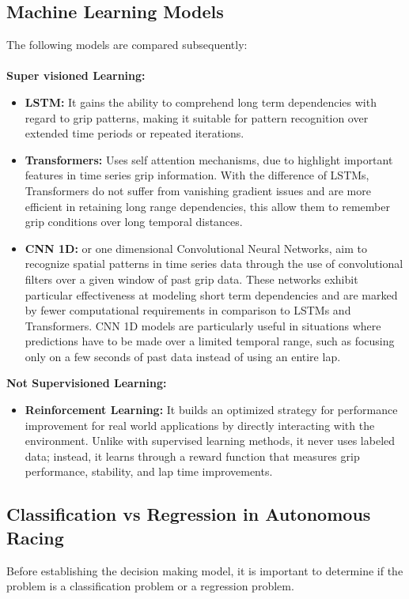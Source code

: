 \documentclass[a4paper,final,12pt]{report}
\begin{document}
\subsection{Machine Learning Models}
The following models are compared subsequently:\\\\
\textbf{Super visioned Learning:}
\begin{itemize}
    \item \textbf{LSTM:} It gains the ability to comprehend long term dependencies with regard to grip patterns, making it suitable for pattern recognition over extended time periods or repeated iterations.
    \item \textbf{Transformers:} Uses self attention mechanisms, due to highlight important features in time series grip information. With the difference of LSTMs, Transformers do not suffer from vanishing gradient issues and are more efficient in retaining long range dependencies, this allow them to remember grip conditions over long temporal distances.
    \item \textbf{CNN 1D:} or one dimensional Convolutional Neural Networks, aim to recognize spatial patterns in time series data through the use of convolutional filters over a given window of past grip data. These networks exhibit particular effectiveness at modeling short term dependencies and are marked by fewer computational requirements in comparison to LSTMs and Transformers. CNN 1D models are particularly useful in situations where predictions have to be made over a limited temporal range, such as focusing only on a few seconds of past data instead of using an entire lap.
\end{itemize}
\textbf{Not Supervisioned Learning:}
\begin{itemize}
    \item \textbf{Reinforcement Learning:} It builds an optimized strategy for performance improvement for real world applications by directly interacting with the environment. Unlike with supervised learning methods, it never uses labeled data; instead, it learns through a reward function that measures grip performance, stability, and lap time improvements.
\end{itemize}

\subsection{Classification vs Regression in Autonomous Racing}

Before establishing the decision making model, it is important to determine if the problem is a classification problem or a regression problem.
\end{document}
